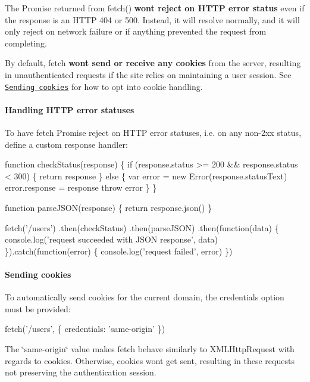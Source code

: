 \begin{DoxyItemize}
\item The Promise returned from {\ttfamily fetch()} {\bfseries won\textquotesingle{}t reject on H\+T\+TP error status} even if the response is an H\+T\+TP 404 or 500. Instead, it will resolve normally, and it will only reject on network failure or if anything prevented the request from completing.
\item By default, {\ttfamily fetch} {\bfseries won\textquotesingle{}t send or receive any cookies} from the server, resulting in unauthenticated requests if the site relies on maintaining a user session. See \href{#sending-cookies}{\tt Sending cookies} for how to opt into cookie handling.
\end{DoxyItemize}

\paragraph*{Handling H\+T\+TP error statuses}

To have {\ttfamily fetch} Promise reject on H\+T\+TP error statuses, i.\+e. on any non-\/2xx status, define a custom response handler\+:


\begin{DoxyCode}
function checkStatus(response) \{
  if (response.status >= 200 && response.status < 300) \{
    return response
  \} else \{
    var error = new Error(response.statusText)
    error.response = response
    throw error
  \}
\}

function parseJSON(response) \{
  return response.json()
\}

fetch('/users')
  .then(checkStatus)
  .then(parseJSON)
  .then(function(data) \{
    console.log('request succeeded with JSON response', data)
  \}).catch(function(error) \{
    console.log('request failed', error)
  \})
\end{DoxyCode}


\paragraph*{Sending cookies}

To automatically send cookies for the current domain, the {\ttfamily credentials} option must be provided\+:


\begin{DoxyCode}
fetch('/users', \{
  credentials: 'same-origin'
\})
\end{DoxyCode}


The \char`\"{}same-\/origin\char`\"{} value makes {\ttfamily fetch} behave similarly to X\+M\+L\+Http\+Request with regards to cookies. Otherwise, cookies won\textquotesingle{}t get sent, resulting in these requests not preserving the authentication session.

